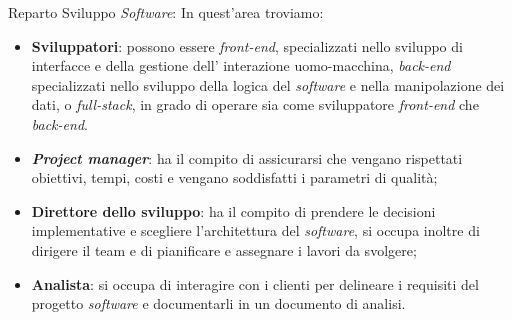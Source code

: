 Reparto Sviluppo \textit{Software}: In quest'area troviamo:
\begin{itemize}
    \item \textbf{Sviluppatori}: possono essere \textit{front-end}, specializzati nello sviluppo di interfacce e della gestione dell'
          interazione uomo-macchina, \textit{back-end} specializzati nello sviluppo della logica del \textit{software} e nella manipolazione dei 
          dati, o \textit{full-stack}, in grado di operare sia come sviluppatore \textit{front-end} che \textit{back-end}.
    \item \textbf{\textit{Project manager}}: ha il compito di assicurarsi che vengano rispettati obiettivi, tempi, costi e vengano soddisfatti
          i parametri di qualità;
    \item \textbf{Direttore dello sviluppo}: ha il compito di prendere le decisioni implementative e scegliere l'architettura del \textit{software}, si 
          occupa inoltre di dirigere il team e di pianificare e assegnare i lavori da svolgere;
    \item \textbf{Analista}: si occupa di interagire con i clienti per delineare i requisiti del progetto \textit{software} e documentarli in un documento 
          di analisi.
\end{itemize}

